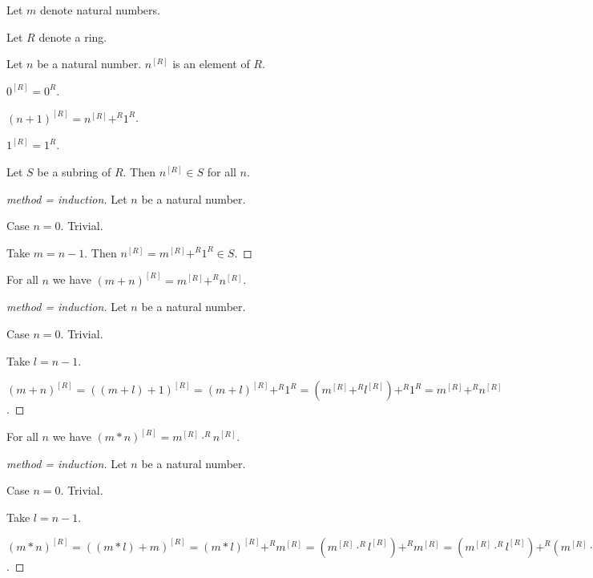 \documentclass[11pt]{article}
\begin{document}
\begin{forthel}

Let $m$ denote natural numbers.

Let $R$ denote a ring.

\begin{signature} Let $n$ be a natural number. $n^{[R]}$ is an element of $R$.
\end{signature}

\begin{axiom} $0^{[R]} = 0^{R}$.
\end{axiom}

\begin{axiom} $(n+1)^{[R]} = n^{[R]} +^{R} 1^{R}$.
\end{axiom}

\begin{lemma}
$1^{[R]} = 1^{R}$.
\end{lemma}

\begin{lemma}
Let $S$ be a subring of $R$. Then $n^{[R]} \in S$ for all $n$.
\end{lemma}
\begin{proof}[method = induction]
Let $n$ be a natural number.

Case $n = 0$. Trivial.

Take $m = n - 1$. Then $n^{[R]} = m^{[R]} +^{R} 1^{R} \in S$.
\end{proof}

\begin{lemma}
For all $n$ we have
$(m + n)^{[R]} = m^{[R]} +^{R} n^{[R]}$.
\end{lemma}
\begin{proof}[method = induction]
Let $n$ be a natural number.

Case $n = 0$. Trivial.

Take $l = n - 1$.

$(m + n)^{[R]} = 
((m + l) + 1)^{[R]} =
(m + l)^{[R]} +^{R} 1^{R} =
(m^{[R]} +^{R} l^{[R]}) +^{R} 1^{R} =
m^{[R]} +^{R} n^{[R]}$.
\end{proof}

\begin{lemma}
For all $n$ we have
$(m * n)^{[R]} = m^{[R]} \cdot^{R} n^{[R]}$.
\end{lemma}
\begin{proof}[method = induction]
Let $n$ be a natural number.

Case $n = 0$. Trivial.

Take $l = n - 1$.

$(m * n)^{[R]} = 
((m * l) + m)^{[R]} =
(m * l)^{[R]} +^{R} m^{[R]} =
(m^{[R]} \cdot^{R} l^{[R]}) +^{R} m^{[R]} =
(m^{[R]} \cdot^{R} l^{[R]}) +^{R} (m^{[R]} \cdot^{R} 1^{R}) =
m^{[R]} \cdot^{R} (l + 1)^{[R]}$.
\end{proof}


\end{forthel}
\end{document}
